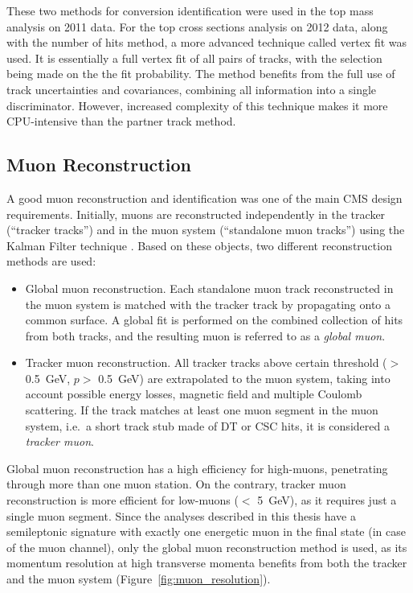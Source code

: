 These two methods for conversion identification were used in the top mass analysis on 2011 data. For the top cross
sections analysis on 2012 data, along with the number of hits method, a more advanced technique called vertex fit was
used. It is essentially a full vertex fit of all pairs of tracks, with the selection being made on the the fit
probability. The method benefits from the full use of track uncertainties and covariances, combining all information
into a single discriminator. However, increased complexity of this technique makes it more CPU-intensive than the
partner track method.


\subsection{Muon Reconstruction}
\label{ss:muon_reconstruction}
A good muon reconstruction and identification was one of the main CMS design requirements. Initially, muons are
reconstructed independently in the tracker (``tracker tracks'') and in the muon system (``standalone muon tracks'')
using the Kalman Filter technique \autocite{KF}. Based on these objects, two different reconstruction methods are used:
\autocite{muon_reconstruction}

\begin{itemize}
  \item Global muon reconstruction. Each standalone muon track reconstructed in the muon system is matched with the
  tracker track by propagating onto a common surface. A global fit is performed on the combined collection of hits from
  both tracks, and the resulting muon is referred to as a \textit{global muon}.
  \item Tracker muon reconstruction. All tracker tracks above certain threshold (\pt $>$ \SI{0.5}{\GeV}, $p >$
  \SI{0.5}{\GeV}) are extrapolated to the muon system, taking into account possible energy losses, magnetic field and
  multiple Coulomb scattering. If the track matches at least one muon segment in the muon system, i.e.\ a short track
  stub made of DT or CSC hits, it is considered a \textit{tracker muon}.
\end{itemize}

Global muon reconstruction has a high efficiency for high-\pt muons, penetrating through more than one muon station. On
the contrary, tracker muon reconstruction is more efficient for low-\pt muons (\pt $<$ \SI{5}{\GeV}), as it requires
just a single muon segment. Since the \ttbar analyses described in this thesis have a semileptonic signature with
exactly one energetic muon in the final state (in case of the muon channel), only the global muon reconstruction method
is used, as its momentum resolution at high transverse momenta benefits from both the tracker and the muon system
(Figure~\ref{fig:muon_resolution}).

